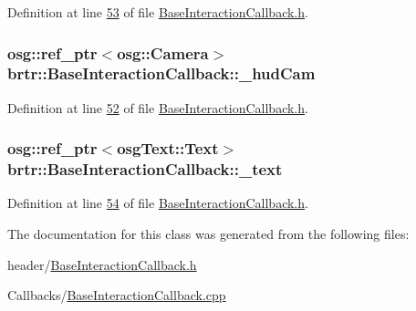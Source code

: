 Definition at line \hyperlink{_base_interaction_callback_8h_source_l00053}{53} of file \hyperlink{_base_interaction_callback_8h_source}{Base\+Interaction\+Callback.\+h}.

\hypertarget{classbrtr_1_1_base_interaction_callback_a0bca3b64724235e08740be94fe4acc8d}{
\subsubsection[{\+\_\+hud\+Cam}]{\setlength{\rightskip}{0pt plus 5cm}osg\+::ref\+\_\+ptr$<$osg\+::\+Camera$>$ brtr\+::\+Base\+Interaction\+Callback\+::\+\_\+hud\+Cam\hspace{0.3cm}{\ttfamily [protected]}}}\label{classbrtr_1_1_base_interaction_callback_a0bca3b64724235e08740be94fe4acc8d}


Definition at line \hyperlink{_base_interaction_callback_8h_source_l00052}{52} of file \hyperlink{_base_interaction_callback_8h_source}{Base\+Interaction\+Callback.\+h}.

\hypertarget{classbrtr_1_1_base_interaction_callback_af60dece4300b09fafe3c048397122cbd}{
\subsubsection[{\+\_\+text}]{\setlength{\rightskip}{0pt plus 5cm}osg\+::ref\+\_\+ptr$<$osg\+Text\+::\+Text$>$ brtr\+::\+Base\+Interaction\+Callback\+::\+\_\+text\hspace{0.3cm}{\ttfamily [protected]}}}\label{classbrtr_1_1_base_interaction_callback_af60dece4300b09fafe3c048397122cbd}


Definition at line \hyperlink{_base_interaction_callback_8h_source_l00054}{54} of file \hyperlink{_base_interaction_callback_8h_source}{Base\+Interaction\+Callback.\+h}.



The documentation for this class was generated from the following files\+:\begin{DoxyCompactItemize}
\item 
header/\hyperlink{_base_interaction_callback_8h}{Base\+Interaction\+Callback.\+h}\item 
Callbacks/\hyperlink{_base_interaction_callback_8cpp}{Base\+Interaction\+Callback.\+cpp}\end{DoxyCompactItemize}
